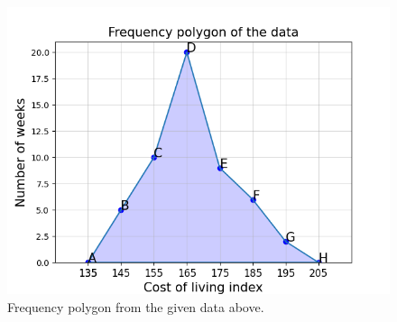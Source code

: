\documentclass[journal,12pt,twocolumn]{IEEEtran}
\begin{document}
\begin{figure}[htb] 
		\centering
		\includegraphics[width=\columnwidth]{Fig_2}
		\caption{Frequency polygon from the given data above.}
	\end{figure}
\end{document}

